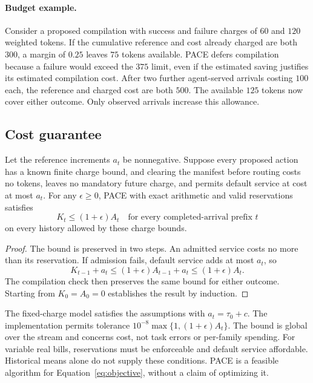 \paragraph{Budget example.}
Consider a proposed compilation with success and failure charges of $60$ and $120$ weighted tokens.
If the cumulative reference and cost already charged are both $300$, a margin of $0.25$ leaves $75$ tokens available.
PACE defers compilation because a failure would exceed the $375$ limit, even if the estimated saving justifies its estimated compilation cost.
After two further agent-served arrivals costing $100$ each, the reference and charged cost are both $500$.
The available $125$ tokens now cover either outcome.
Only observed arrivals increase this allowance.

\subsection{Cost guarantee}
\label{sec:guarantee}

\begin{theorem}
\label{thm:cost-protection}
Let the reference increments $a_t$ be nonnegative.
Suppose every proposed action has a known finite charge bound, and clearing the manifest before routing costs no tokens, leaves no mandatory future charge, and permits default service at cost at most $a_t$.
For any $\epsilon\geq0$, PACE with exact arithmetic and valid reservations satisfies
\begin{equation}
K_t\leq(1+\epsilon)A_t
\quad\text{for every completed-arrival prefix }t
\label{eq:cost-guarantee}
\end{equation}
on every history allowed by these charge bounds.
\end{theorem}

\begin{proof}
The bound is preserved in two steps.
An admitted service costs no more than its reservation.
If admission fails, default service adds at most $a_t$, so
\[
K_{t-1}+a_t\leq(1+\epsilon)A_{t-1}+a_t\leq(1+\epsilon)A_t.
\]
The compilation check then preserves the same bound for either outcome.
Starting from $K_0=A_0=0$ establishes the result by induction.
\end{proof}

The fixed-charge model satisfies the assumptions with $a_t=\tau_0+c$.
The implementation permits tolerance $10^{-8}\max\{1,(1+\epsilon)A_t\}$.
The bound is global over the stream and concerns cost, not task errors or per-family spending.
For variable real bills, reservations must be enforceable and default service affordable.
Historical means alone do not supply these conditions.
PACE is a feasible algorithm for Equation~\ref{eq:objective}, without a claim of optimizing it.
